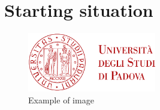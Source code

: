 
\chapter{Starting situation}
\label{chp:starting situation}

\begin{figure}[ht]
    \centering
    \includegraphics[width=0.5\textwidth]{res/ltunipd}
    \caption{Example of image}
\end{figure}